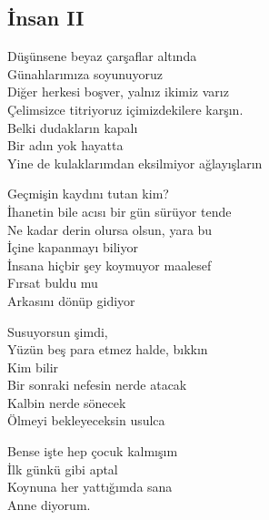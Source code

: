 \subsection{İnsan II}

Düşünsene beyaz çarşaflar altında \\
Günahlarımıza soyunuyoruz \\
Diğer herkesi boşver, yalnız ikimiz varız \\
Çelimsizce titriyoruz içimizdekilere karşın. \\
Belki dudakların kapalı \\
Bir adın yok hayatta \\
Yine de kulaklarımdan eksilmiyor ağlayışların

\noindent\newline
Geçmişin kaydını tutan kim? \\
İhanetin bile acısı bir gün sürüyor tende \\
Ne kadar derin olursa olsun, yara bu \\
İçine kapanmayı biliyor \\
İnsana hiçbir şey koymuyor maalesef \\
Fırsat buldu mu \\
Arkasını dönüp gidiyor

\noindent\newline
Susuyorsun şimdi, \\
Yüzün beş para etmez halde, bıkkın \\
Kim bilir \\
Bir sonraki nefesin nerde atacak \\
Kalbin nerde sönecek \\
Ölmeyi bekleyeceksin usulca

\noindent\newline
Bense işte hep çocuk kalmışım \\
İlk günkü gibi aptal \\
Koynuna her yattığımda sana \\
Anne diyorum.